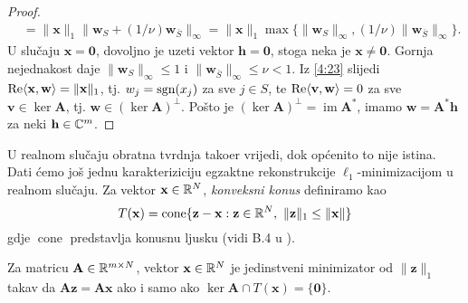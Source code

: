 \documentclass[a4paper,twoside,12pt]{memoir} %
\newcommand{\vect}[1]{\mathbf{#1}}
\renewcommand{\vec}{\vect}
\newcommand{\norm}[1]{\|{#1}\|}
\newcommand{\sgn}{\text{\normalfont{sgn}}}
\renewcommand{\Re}{\text{\normalfont{Re}}}
\DeclareMathOperator{\im}{im}
\DeclareMathOperator{\cone}{cone}
\begin{document}
\begin{proof}
\begin{align*}
        &= \norm{\vec x}_1 \norm{\vec w_S + (1/\nu)\vec w_{\bar S}}_{\infty} = \norm{\vec x}_1 \max\{ \norm{\vec w_S}_{\infty}, (1/\nu) \norm{\vec w_{\bar S}}_{\infty} \}.
    \end{align*}
    U slu\v{c}aju $\vec x = \vec 0$, dovoljno je uzeti vektor $\vec h = \vec 0$, stoga neka je $\vec x \neq \vec 0$. Gornja nejednakost daje $\norm{\vec w_S}_{\infty} \leq 1$ i $\norm{\vec w_{\bar S}}_{\infty} \leq \nu < 1$. Iz \eqref{4:23} slijedi $\Re \langle \vec x, \vec w\rangle = \norm{\vec x}_1$, tj. $w_j = \sgn(x_j)$ za sve $j \in S$, te $\Re \langle \vec v, \vec w \rangle = 0$ za sve $\vec v \in \ker \vec A$, tj. $\vec w \in (\ker \vec A)^{\perp}$. Po\v{s}to je $(\ker \vec A)^{\perp} = \im \vec A^*$, imamo $\vec w = \vec A^* \vec h$ za neki $\vec h \in \C^m$.
\end{proof}
U realnom slu\v{c}aju obratna tvrdnja tako\dj er vrijedi, dok op\'cenito to nije istina. Dati \'cemo jo\v{s} jednu karakteriziciju egzaktne rekonstrukcije $\ell_1$-minimizacijom u realnom slu\v{c}aju. Za vektor $\vec x \in \R^N$, \textit{konveksni konus} definiramo kao
\begin{equation}\label{4:34}
    T(\vec x) = \cone \{ \vec z - \vec x : \vec z \in \R^N,\ \norm{\vec z}_1 \leq \norm{\vec x}\} 
\end{equation}
gdje $\cone$ predstavlja konusnu ljusku (vidi B.4 u \cite{foucart13}).
\begin{thm}
    Za matricu $\vec A \in \R^{m \times N}$, vektor $\vec x \in \R^N$ je jedinstveni minimizator od $\norm{\vec z}_1$ takav da $\vec{Az} = \vec{Ax}$ ako i samo ako $\ker \vec A \cap T(\vec x) = \{\vec 0\}$.
\end{thm}
\end{document}
